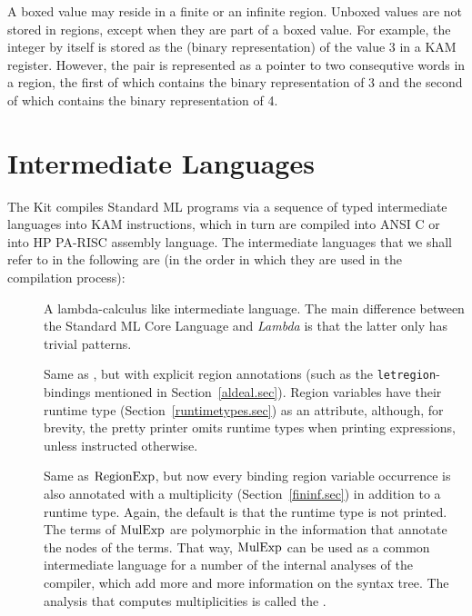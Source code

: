 \documentclass[12pt]{book}
\begin{document}
A boxed value may reside in a finite or an infinite region.
Unboxed values are not stored in regions, except when they
are part of a boxed value. For example, the integer  by itself
is stored as the (binary representation) of the value 3 in a
KAM register. However, the pair  is represented as a
pointer to two consequtive words in a region, the first of which contains
the binary representation of 3 and the second of which contains the binary
representation of 4.

\section{Intermediate Languages}
The Kit compiles Standard ML programs via a sequence of typed intermediate 
languages into  KAM instructions, which in turn are compiled into ANSI C or into HP 
PA-RISC assembly language.
The intermediate languages that
we shall refer to in the following are (in the order in which they are used in the
compilation process):
\begin{description}
\item[\Lam] A lambda-calculus like intermediate language. The main difference between
  the Standard ML Core Language and {\it Lambda} is that the latter only has trivial patterns.
\item[\RegExp] Same as \Lam, 
but with explicit region annotations (such as the {\tt letregion}-bindings
mentioned in Section~\ref{aldeal.sec}). Region variables have their runtime type (Section~\ref{runtimetypes.sec})
as an attribute, although, for brevity, the pretty printer omits runtime types when printing expressions, 
unless instructed otherwise.
\item[\MulExp] Same as $\hbox{\rm RegionExp}$, but now every binding region variable occurrence
is also annotated with a multiplicity (Section~\ref{fininf.sec}) in addition to a runtime type.
Again, the default is that the runtime type is not printed. The terms of $\hbox{\rm MulExp}$ are polymorphic 
in the information that annotate the nodes of the terms. That way, $\hbox{\rm MulExp}$ can be used
as a common intermediate language for a number of the internal analyses of the compiler, which
add more and more information on the syntax tree.
The analysis that computes multiplicities is called the .
\end{description}
\end{document}
